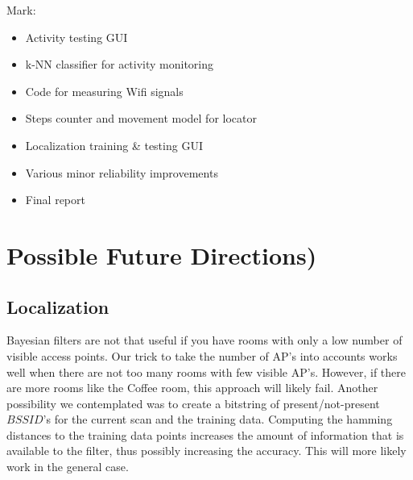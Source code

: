 \documentclass[a4paper,10pt,twoside]{IEEEtran}
\begin{document}
Mark:
\begin{itemize}
    \item Activity testing GUI
    \item k-NN classifier for activity monitoring
    \item Code for measuring Wifi signals
    \item Steps counter and movement model for locator
    \item Localization training \& testing GUI
    \item Various minor reliability improvements
    \item Final report
\end{itemize}

\section{Possible Future Directions)}
\label{sec:future-directions}

\subsection{Localization}
Bayesian filters are not that useful if you have rooms with only a low number of visible access points.
Our trick to take the number of AP's into accounts works well when there
are not too many rooms with few visible AP's.
However, if there are more rooms like the Coffee room, this approach will likely fail.
Another possibility we contemplated was to create a bitstring of present/not-present $BSSID$'s for the current scan and the training data.
Computing the hamming distances to the training data points increases the amount of information that
is available to the filter, thus possibly increasing the accuracy.
This will more likely work in the general case.

{}


\end{document}
